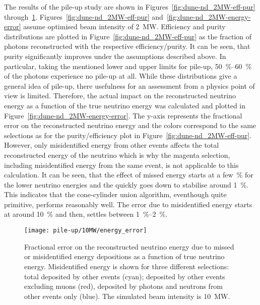 The results of the pile-up study are shown in Figures~\ref{fig:dune-nd_2MW-eff-pur} through~\ref{fig:dune-nd_10MW-energy-error}.
Figures~\ref{fig:dune-nd_2MW-eff-pur} and~\ref{fig:dune-nd_2MW-energy-error} assume optimised beam intensity of \SI{2}{\mega\watt}.
Efficiency and purity distributions are plotted in Figure~\ref{fig:dune-nd_2MW-eff-pur} as the fraction of \Pgpz photons reconstructed with the respective efficiency/purity.
It can be seen, that purity significantly improves under the assumptions described above.
In particular, taking the mentioned lower and upper limits for pile-up, \SIrange{50}{60}{\percent} of the photons experience no pile-up at all.
While these distributions give a general idea of pile-up, there usefulness for an assessment from a physics point of view is limited.
Therefore, the actual impact on the reconstructed neutrino energy as a function of the true neutrino energy was calculated and plotted in Figure~\ref{fig:dune-nd_2MW-energy-error}.
The y-axis represents the fractional error on the reconstructed neutrino energy and the colors correspond to the same selections as for the purity/efficiency plot in Figure~\ref{fig:dune-nd_2MW-eff-pur}.
However, only misidentified energy from other events affects the total reconstructed energy of the neutrino which is why the magenta selection, including misidentified energy from the same event, is not applicable to this calculation.
It can be seen, that the effect of missed energy starts at a few~\si{\percent} for the lower neutrino energies and the quickly goes down to stabilise around \SI{1}{\percent}.
This indicates that the cone-cylinder union algorithm, eventhough quite primitive, performs reasonably well.
The error due to misidentified energy starts at around \SI{10}{\percent} and then, settles between \SIrange{1}{2}{\percent}.

\begin{figure}[htb]
	\centering
	\texttt{[image: pile-up/10MW/energy\_error]}
	\caption{Fractional error on the reconstructed neutrino energy due to missed or misidentified energy depositions as a function of true neutrino energy.
	Misidentified energy is shown for three different selections: total deposited by other events (cyan); deposited by other events excluding muons (red), deposited by photons and neutrons from other events only (blue).
	The simulated beam intensity is \SI{10}{\mega\watt}.}
	\label{fig:dune-nd_10MW-energy-error}
\end{figure}

